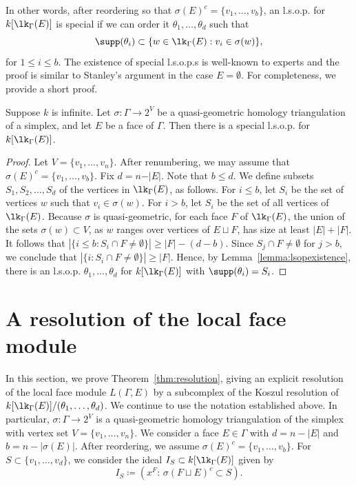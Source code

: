In other words, after reordering so that $\sigma(E)^c = \{v_1, \ldots, v_b\}$, an l.s.o.p. for $k[\lk_\Gamma(E)]$ is special if we can order it $\theta_1, \ldots, \theta_d$ such that
\[
\supp(\theta_i) \subset \{ w \in \lk_\Gamma(E) : v_i \in \sigma(w)\},
\]
for $1 \leq i \leq b$.  The existence of special l.s.o.p.s is well-known to experts and the proof is similar to Stanley's argument in the case $E = \emptyset$. For completeness, we provide a short proof.

\begin{proposition} \label{prop:speciallsopexistence}
Suppose $k$ is infinite. Let $\sigma\colon \Gamma \to 2^V$ be a quasi-geometric homology triangulation of a simplex, and let $E$ be a face of $\Gamma$. Then there is a special l.s.o.p. for $k[\lk_{\Gamma}(E)]$.
\end{proposition}
\begin{proof}

Let $V = \{v_1, \ldots, v_n\}$.  After renumbering, we may assume that $\sigma(E)^c = \{v_1, \dotsc, v_b\}$. Fix $d = n - \vert E \vert$. Note that $b \leq d$.  We define subsets $S_1, S_2, \dotsc, S_{d}$ of the vertices in $\lk_{\Gamma}(E)$, as follows. For $i \le b$, let $S_i$ be the set of vertices $w$ such that $v_i \in \sigma(w)$. 
For $i > b$, let $S_i$ be the set of all vertices of $\lk_{\Gamma}(E)$. Because $\sigma$ is quasi-geometric, for each face $F$ of $\lk_{\Gamma}(E)$, the union of the sets $\sigma(w) \subset V$, as $w$ ranges over vertices of $E \sqcup F$, has size at least $|E| + |F|$.  It follows that $|\{i \leq b : S_i \cap F \neq \emptyset \}| \geq |F| - (d-b)$.  Since $S_j \cap F \neq \emptyset$ for $j > b$, we conclude that $|\{i : S_i \cap F \neq \emptyset \}| \geq |F|$.  Hence, by Lemma~\ref{lemma:lsopexistence}, there is an l.s.o.p. $\theta_1, \ldots, \theta_d$ for $k[\lk_\Gamma(E)]$ with $\supp(\theta_i) = S_i$. 
\end{proof}


\section{A resolution of the local face module}

In this section, we prove Theorem~\ref{thm:resolution}, giving an explicit resolution of the local face module $L(\Gamma,E)$ by a subcomplex of the Koszul resolution of $k[\lk_{\Gamma}(E)]/(\theta_1, \dotsc, \theta_{d})$.  We continue to use the notation established above.  In particular, $\sigma\colon \Gamma \to 2^V$ is a quasi-geometric homology triangulation of the simplex with vertex set $V = \{v_1, \ldots, v_n\}$. We consider a face $E \in \Gamma$ with $d = n - |E|$ and $b = n - |\sigma(E)|$.  After reordering, we assume $\sigma(E)^c = \{v_{1}, \dotsc, v_{b}\}$. For $S \subset \{v_1, \ldots, v_d\}$, 
we consider the ideal $I_S \subset k[\lk_\Gamma(E)]$ given by
\begin{equation*}
I_S  \coloneqq  ( x^F : \, \sigma(F \sqcup E)^c \subset S).  
\end{equation*}

